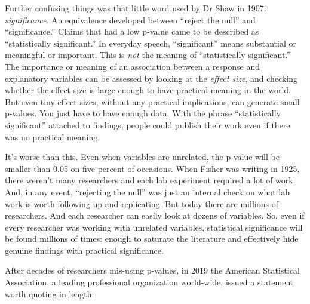 \documentclass[]{book}
\begin{document}
Further confusing things was that little word used by Dr Shaw in 1907: \emph{significance}. An equivalence developed between ``reject the null'' and ``significance.'' Claims that had a low p-value came to be described as ``statistically significant.'' In everyday speech, ``significant'' means substantial or meaningful or important. This is \emph{not} the meaning of ``statistically significant.'' The importance or meaning of an association between a response and explanatory variables can be assessed by looking at the \emph{effect size}, and checking whether the effect size is large enough to have practical meaning in the world. But even tiny effect sizes, without any practical implications, can generate small p-values. You just have to have enough data. With the phrase ``statistically significant'' attached to findings, people could publish their work even if there was no practical meaning.

It's worse than this. Even when variables are unrelated, the p-value will be smaller than 0.05 on five percent of occasions. When Fisher was writing in 1925, there weren't many researchers and each lab experiment required a lot of work. And, in any event, ``rejecting the null'' was just an internal check on what lab work is worth following up and replicating. But today there are millions of researchers. And each researcher can easily look at dozens of variables. So, even if every researcher was working with unrelated variables, statistical significance will be found millions of times: enough to saturate the literature and effectively hide genuine findings with practical significance.

After decades of researchers mis-using p-values, in 2019 the American Statistical Association, a leading professional organization world-wide, issued a statement worth quoting in length:
\end{document}
